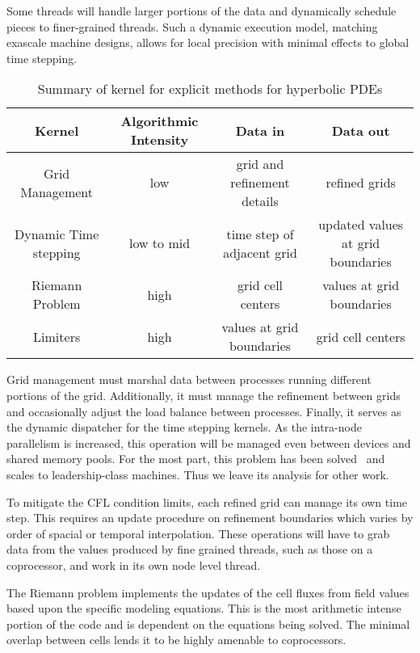 \documentclass{article}
\begin{document}
Some threads will handle larger portions of the data and
dynamically schedule pieces to finer-grained threads. Such a dynamic
execution model, matching exascale machine designs, allows for local precision
with minimal effects to global time stepping.

\begin{table}
  \begin{tabular}{|cccc|}
    \hline
    Kernel & Algorithmic Intensity & Data in & Data out\\
    \hline
    Grid Management & low & grid and refinement details & refined grids \\
    Dynamic Time stepping & low to mid & time step of adjacent grid & updated
    values at grid boundaries\\
    Riemann Problem & high & grid cell centers & values at grid boundaries \\
    Limiters & high & values at grid boundaries & grid cell centers \\
    \hline
\end{tabular}
\label{table:explicit_kernels}
\caption{Summary of kernel for explicit methods for hyperbolic PDEs}
\end{table}

Grid management must marshal data between processes running different portions
of the grid. Additionally, it must manage the refinement between grids and
occasionally adjust the load balance between processes. Finally, it serves as
the dynamic dispatcher for the time stepping kernels. As the intra-node
parallelism is increased, this operation will be managed even between devices
and shared memory pools. For the most part, this problem has been
solved~\cite{PyClaw:te,Ketcheson:2011tj} and scales to leadership-class
machines. Thus we leave its analysis for other work.


To mitigate the CFL condition limits, each refined grid can manage its own time
step. This requires an update procedure on refinement boundaries which varies
by order of spacial or temporal interpolation. These operations will have to
grab data from the values produced by fine grained threads, such as those on
a coprocessor, and work in its own node level thread.

The Riemann problem implements the updates of the cell fluxes from field values
based upon the specific modeling equations. This is the most arithmetic intense
portion of the code and is dependent on the equations being solved. The minimal
overlap between cells lends it to be highly amenable to coprocessors.
\end{document}

